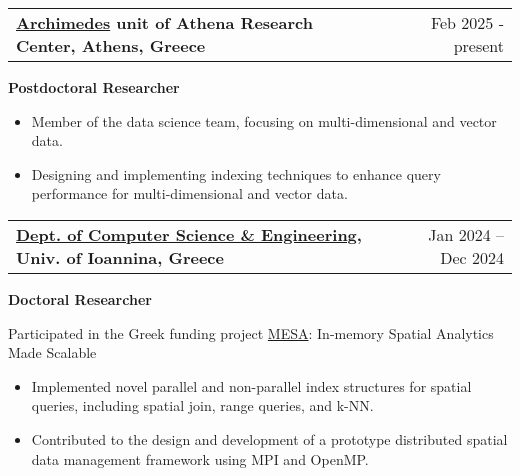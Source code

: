\documentclass[a4paper,12pt]{article}
\makeatletter
\newenvironment{job}[2]
{
	\begin{tabularx}{\linewidth}{@{}l X r@{}}
		\small
		\textbf{#1} & \hfill &  #2 \\[3.75pt]
	\end{tabularx}
	\begin{minipage}[t]{\linewidth}
		\footnotesize
		\setlength{\parskip}{3pt} %
		\setlength{\parindent}{0pt} %
	}
	{
	\end{minipage}    
}
\makeatother
\begin{document}
\begin{job}{\href{https://archimedesai.gr/en/}{Archimedes} unit of Athena Research Center, Athens, Greece}{Feb 2025 - present}
\textbf{Postdoctoral Researcher}

\begin{itemize}

\item Member of the data science team, focusing on multi-dimensional and vector data.
\item Designing and implementing indexing techniques to enhance query performance for multi-dimensional and vector data.
\end{itemize}

\end{job}

\vspace{-1\baselineskip}

\begin{job}{\href{https://www.cse.uoi.gr/?lang=en}{Dept. of Computer Science \& Engineering}, Univ. of Ioannina, Greece}{Jan 2024 – Dec 2024}
	\textbf{Doctoral Researcher}
	
	Participated in the Greek funding project \href {https://www.cs.uoi.gr/~nikos/mesa/}{MESA}: In-memory Spatial Analytics Made Scalable 
	
	\begin{itemize}
		
		\item Implemented novel parallel and non-parallel index structures for spatial queries, including spatial join, range queries, and k-NN.
		
		\item Contributed to the design and development of a prototype distributed spatial data management framework using MPI and OpenMP.
		
	\end{itemize}
	
\end{job}

\vspace{-1.2\baselineskip}
\end{document}

